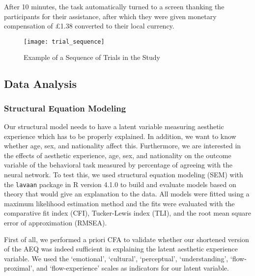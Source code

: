 \documentclass[../main.tex]{subfiles}
\begin{document}
After 10 minutes, the task automatically turned to a screen thanking the participants for their assistance, after which they were given monetary compensation of £1.38 converted to their local currency.
	

\begin{figure}
	\centering
	\caption{Example of a Sequence of Trials in the Study}
	\label{fig:trial_sequence}
	\texttt{[image: trial\_sequence]}
\end{figure}

	
\subsection{Data Analysis}
	\subsubsection{Structural Equation Modeling}
	Our structural model needs to have a latent variable measuring aesthetic experience which has to be properly explained. In addition, we want to know whether age, sex, and nationality affect this. Furthermore, we are interested in the effects of aesthetic experience, age, sex, and nationality on the outcome variable of the behavioral task measured by percentage of agreeing with the neural network. To test this, we used structural equation modeling (SEM) with the \texttt{lavaan} package \parencite{rosseel2012lavaan} in R version 4.1.0 \parencite{rcoreteamlanguage} to build and evaluate models based on theory that would give an explanation to the data. All models were fitted using a maximum likelihood estimation method and the fits were evaluated with the comparative fit index (CFI), Tucker-Lewis index (TLI), and the root mean square error of approximation (RMSEA).
	
	First of all, we performed a priori CFA to validate whether our shortened version of the AEQ was indeed sufficient in explaining the latent aesthetic experience variable. We used the `emotional', `cultural', `perceptual', `understanding', `flow-proximal', and `flow-experience' scales as indicators for our latent variable. 
	
\end{document}

